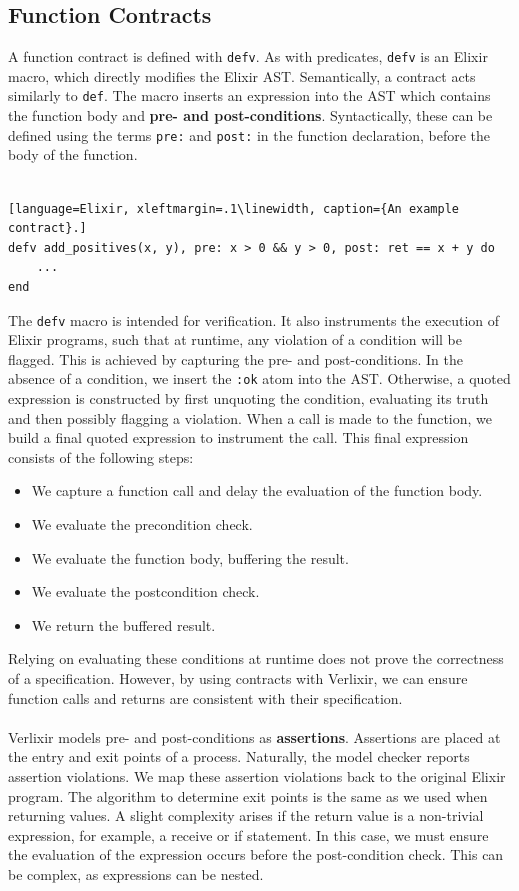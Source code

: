 \subsection{Function Contracts}
A function contract is defined with \texttt{defv}. As with predicates, \texttt{defv} is an Elixir macro, which directly modifies the Elixir AST. Semantically, a contract acts similarly to \texttt{def}. The macro inserts an expression into the AST which contains the function body and \textbf{pre- and post-conditions}. Syntactically, these can be defined using the terms \texttt{pre:} and \texttt{post:} in the function declaration, before the body of the function.
\\ \\
\begin{lstlisting}[language=Elixir, xleftmargin=.1\linewidth, caption={An example contract}.]
defv add_positives(x, y), pre: x > 0 && y > 0, post: ret == x + y do
    ...
end
\end{lstlisting}
The \texttt{defv} macro is intended for verification. It also instruments the execution of Elixir programs, such that at runtime, any violation of a condition will be flagged. This is achieved by capturing the pre- and post-conditions. In the absence of a condition, we insert the \texttt{:ok} atom into the AST. Otherwise, a quoted expression is constructed by first unquoting the condition, evaluating its truth and then possibly flagging a violation. When a call is made to the function, we build a final quoted expression to instrument the call. This final expression consists of the following steps:
\begin{itemize}
    \item We capture a function call and delay the evaluation of the function body.
    \item We evaluate the precondition check.
    \item We evaluate the function body, buffering the result.
    \item We evaluate the postcondition check.
    \item We return the buffered result.
\end{itemize}
Relying on evaluating these conditions at runtime does not prove the correctness of a specification. However, by using contracts with Verlixir, we can ensure function calls and returns are consistent with their specification.
\\ \\
Verlixir models pre- and post-conditions as \textbf{assertions}. Assertions are placed at the entry and exit points of a process. Naturally, the model checker reports assertion violations. We map these assertion violations back to the original Elixir program. The algorithm to determine exit points is the same as we used when returning values. A slight complexity arises if the return value is a non-trivial expression, for example, a receive or if statement. In this case, we must ensure the evaluation of the expression occurs before the post-condition check. This can be complex, as expressions can be nested.
\\ \\

